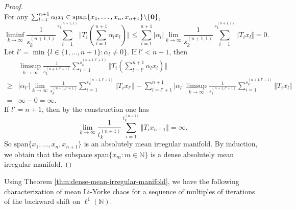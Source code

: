 \documentclass[12pt,a4paper]{amsart}
\theoremstyle{definition}
\theoremstyle{plain}
\begin{document}
\begin{proof}
\[    \]
    For any $\sum_{l=1}^{n+1} \alpha_lx_l \in \text{span} \{x_1, \ldots, x_n, x_{n+1}\} \backslash \{{\bf 0}\}$,
    \[
        \liminf_{k\to \infty} \frac{1}{s_k^{(n+1,1)}} \sum_{i=1}^{s_k^{(n+1,1)} } \Vert T_{i}  (\sum_{l=1}^{n+1} \alpha_lx_l )\Vert \le \sum_{l=1}^{n+1} |\alpha_l|  \lim_{k\to \infty} \frac{1}{s_k^{(n+1,1)}} \sum_{i=1}^{s_k^{(n+1,1)} } \Vert T_{i}  x_l \Vert =0.
    \]
    Let $l'=\min \{l\in \{1, \ldots, n+1\}: \alpha_l \neq 0\}$.
    If $l'<n+1$, then
    \begin{align*}
            & \limsup_{k\to \infty} \frac{1}{s_k^{(n+1,l'+1)}} \sum_{i=1}^{s_k^{(n+1,l'+1)} } \Vert T_{i} (\sum_{l=l'}^{n+1} \alpha_lx_l) \Vert  \\
        \ge &
        |\alpha_{l'}| \lim_{k\to \infty}  \frac{1}{s_k^{(n+1, l'+1)}} \sum_{i=1}^{s_k^{(n+1,l'+1)} } \Vert T_{i} x_{l'} \Vert
        -\sum_{l=l'+1}^{n+1} |\alpha_l| \limsup_{k\to \infty}\frac{1}{s_k^{(n+1,l'+1)}} \sum_{i=1}^{s_k^{(n+1,l'+1)} } \Vert T_{i} x_l \Vert \\
        =   & \infty-0=\infty.
    \end{align*}
    If $l'=n+1$, then by the construction one has
    \[
        \lim_{k\to \infty} \frac{1}{t_k^{(n+1)}} \sum_{i=1}^{t_k^{(n+1)}} \Vert T_{i} x_{n+1} \Vert =\infty.
    \]
    So $\text{span}\{x_1, \ldots, x_n, x_{n+1}\}$ is an absolutely mean irregular manifold.
    By induction, we obtain that the subspace
    $\text{span}\{x_m: m\in \mathbb{N}\}$ is a dense absolutely mean irregular manifold.
\end{proof}

Using Theorem \ref{thm:dense-mean-irregular-manifold}, we have the following characterization of mean Li-Yorke chaos for a sequence of multiples of iterations of the backward shift on $\ell^1(\mathbb{N})$.
\end{document}
